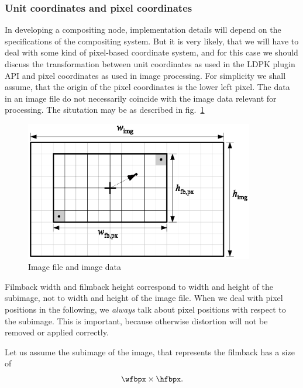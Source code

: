 \documentclass[10pt,a4paper]{article}
\begin{document}
\subsubsection{Unit coordinates and pixel coordinates}
In developing a compositing node, implementation details will depend on the
specifications of the compositing system. But it is very likely, that we will
have to deal with some kind of pixel-based coordinate system, and for this case
we should discuss the transformation between unit coordinates as used in the LDPK plugin API
and pixel coordinates as used in image processing.
For simplicity we shall assume, that the origin of the pixel coordinates is the lower left
pixel. The data in an image file do not necessarily coincide with the image data
relevant for processing. The situtation may be as described in fig.~\ref{fig:ImageAndSubimage}
\begin{figure}[ht]
\centering
\includegraphics[width=10cm]{image_and_subimage.eps}
\caption{Image file and image data}
\label{fig:ImageAndSubimage}
\end{figure}
Filmback width and filmback height correspond to width and height
of the subimage, not to width and height of the image file.
When we deal with pixel positions in the following,
we {\em always} talk about pixel positions with respect to the subimage.
This is important, because otherwise
distortion will not be removed or applied correctly.



Let us assume the subimage of the image, that represents the filmback has a size of
\begin{equation}
\wfbpx\times\hfbpx.
\end{equation}
\end{document}
